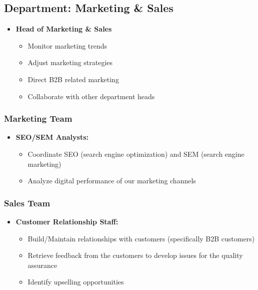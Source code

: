 \subsection{Department: Marketing \& Sales}
\begin{itemize}
    \item \textbf{Head of Marketing \& Sales}
            \begin{itemize}
                \item Monitor marketing trends
                \item Adjust marketing strategies
                \item Direct B2B related marketing
                \item Collaborate with other department heads
            \end{itemize}    
\end{itemize}

\subsubsection*{Marketing Team}
\begin{itemize}
    \item \textbf{SEO/SEM Analysts:}
            \begin{itemize}
                \item Coordinate SEO (search engine optimization) and SEM (search engine marketing)
                \item Analyze digital performance of our marketing channels
            \end{itemize}
\end{itemize}

\subsubsection*{Sales Team}
\begin{itemize}
    \item \textbf{Customer Relationship Staff:}
            \begin{itemize}
                \item Build/Maintain relationships with customers (specifically B2B customers)
                \item Retrieve feedback from the customers to develop issues for the quality assurance
                \item Identify upselling opportunities
            \end{itemize}
\end{itemize}

